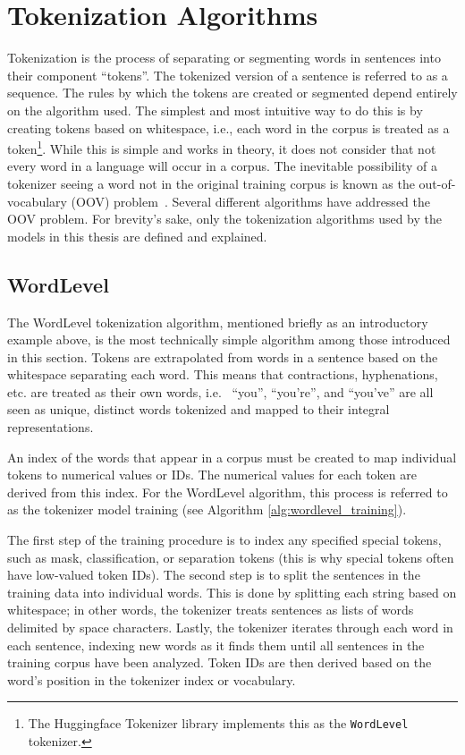 \documentclass[12pt]{article}
\begin{document}
\section{Tokenization Algorithms}\label{sec:tokenizers}
Tokenization is the process of separating or segmenting words in sentences into their component ``tokens''. The tokenized version of a sentence is referred to as a sequence. The rules by which the tokens are created or segmented depend entirely on the algorithm used. The simplest and most intuitive way to do this is by creating tokens based on whitespace, i.e., each word in the corpus is treated as a token\footnote{The Huggingface Tokenizer library implements this as the \lstinline|WordLevel| tokenizer.}. While this is simple and works in theory, it does not consider that not every word in a language will occur in a corpus. The inevitable possibility of a tokenizer seeing a word not in the original training corpus is known as the out-of-vocabulary (OOV) problem~\cite{wu_googles_2016}. Several different algorithms have addressed the OOV problem. For brevity's sake, only the tokenization algorithms used by the models in this thesis are defined and explained.

\subsection{WordLevel}\label{sec:wordlevel}
The WordLevel \cite{wolf_transformers_2020} tokenization algorithm, mentioned briefly as an introductory example above, is the most technically simple algorithm among those introduced in this section. Tokens are extrapolated from words in a sentence based on the whitespace separating each word. This means that contractions, hyphenations, etc. are treated as their own words, i.e.~ ``you'', ``you're'', and ``you've'' are all seen as unique, distinct words tokenized and mapped to their integral representations.

An index of the words that appear in a corpus must be created to map individual tokens to numerical values or IDs. The numerical values for each token are derived from this index. For the WordLevel algorithm, this process is referred to as the tokenizer model training (see Algorithm \ref{alg:wordlevel_training}).

The first step of the training procedure is to index any specified special tokens, such as mask, classification, or separation tokens (this is why special tokens often have low-valued token IDs). The second step is to split the sentences in the training data into individual words. This is done by splitting each string based on whitespace; in other words, the tokenizer treats sentences as lists of words delimited by space characters. Lastly, the tokenizer iterates through each word in each sentence, indexing new words as it finds them until all sentences in the training corpus have been analyzed. Token IDs are then derived based on the word's position in the tokenizer index or vocabulary.
\end{document}
